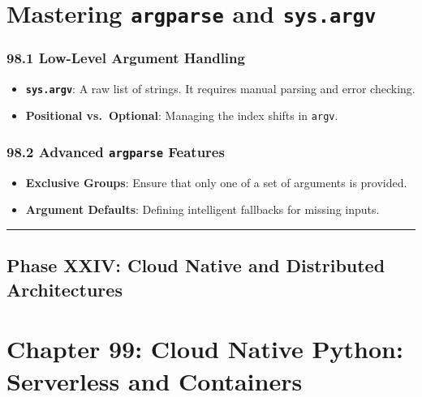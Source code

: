 \hypertarget{mastering-argparse-and-sys.argv}{%
\chapter{\texorpdfstring{Mastering \texttt{argparse} and
\texttt{sys.argv}}{Mastering argparse and sys.argv}}\label{mastering-argparse-and-sys.argv}}

\hypertarget{low-level-argument-handling}{%
\subsection{98.1 Low-Level Argument
Handling}\label{low-level-argument-handling}}

\begin{itemize}
\tightlist
\item
  \textbf{\passthrough{\lstinline!sys.argv!}}: A raw list of strings. It
  requires manual parsing and error checking.
\item
  \textbf{Positional vs.~Optional}: Managing the index shifts in
  \passthrough{\lstinline!argv!}.
\end{itemize}

\hypertarget{advanced-argparse-features}{%
\subsection{\texorpdfstring{98.2 Advanced \texttt{argparse}
Features}{98.2 Advanced argparse Features}}\label{advanced-argparse-features}}

\begin{itemize}
\tightlist
\item
  \textbf{Exclusive Groups}: Ensure that only one of a set of arguments
  is provided.
\item
  \textbf{Argument Defaults}: Defining intelligent fallbacks for missing
  inputs.
\end{itemize}

\begin{center}\rule{0.5\linewidth}{0.5pt}\end{center}

\hypertarget{phase-xxiv-cloud-native-and-distributed-architectures}{%
\section{Phase XXIV: Cloud Native and Distributed
Architectures}\label{phase-xxiv-cloud-native-and-distributed-architectures}}

\hypertarget{chapter-99-cloud-native-python-serverless-and-containers}{%
\chapter{Chapter 99: Cloud Native Python: Serverless and
Containers}\label{chapter-99-cloud-native-python-serverless-and-containers}}

